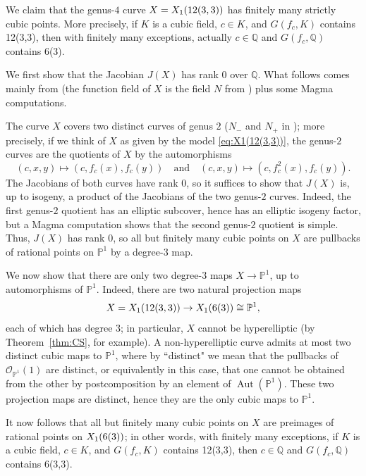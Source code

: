 \documentclass[12pt]{amsart}
\theoremstyle{definition}
\newcommand{\bbP}{\mathbb{P}}
\newcommand{\bbQ}{\mathbb{Q}}
\newcommand{\Aut}{\operatorname{Aut}}
\numberwithin{equation}{section}
\begin{document}
 We claim that the genus-$4$ curve $X = X_1({\rm 12(3,3)})$ has finitely many strictly cubic points. More precisely, if $K$ is a cubic field, $c \in K$, and $G(f_c,K)$ contains 12(3,3), then with finitely many exceptions, actually $c \in \bbQ$ and $G(f_c,\bbQ)$ contains 6(3).

We first show that the Jacobian $J(X)$ has rank $0$ over $\bbQ$. What follows comes mainly from \cite[]{morton:1992} (the function field of $X$ is the field $N$ from \cite{morton:1992}) plus some Magma computations.

The curve $X$ covers two distinct curves of genus $2$ ($N_-$ and $N_+$ in \cite{morton:1992}); more precisely, if we think of $X$ as given by the model \eqref{eq:X1(12(3,3))}, the genus-$2$ curves are the quotients of $X$ by the automorphisms
    \[
        (c,x,y)\mapsto(c,f_c(x),f_c(y)) \quad\text{and}\quad 
        (c,x,y)\mapsto(c,f_c^2(x),f_c(y)).
    \]
The Jacobians of both curves have rank $0$, so it suffices to show that $J(X)$ is, up to isogeny, a product of the Jacobians of the two genus-$2$ curves. Indeed, the first genus-$2$ quotient has an elliptic subcover, hence has an elliptic isogeny factor, but a Magma computation shows that the second genus-$2$ quotient is simple. Thus, $J(X)$ has rank $0$, so all but finitely many cubic points on $X$ are pullbacks of rational points on $\bbP^1$ by a degree-$3$ map.

We now show that there are only two degree-$3$ maps $X \to \bbP^1$, up to automorphisms of $\bbP^1$. Indeed, there are two natural projection maps
    \[
        X = X_1({\rm 12(3,3)}) \to X_1({\rm 6(3)}) \cong \bbP^1,
    \]
each of which has degree $3$; in particular, $X$ cannot be hyperelliptic (by Theorem~\ref{thm:CS}, for example). A non-hyperelliptic curve admits at most two distinct cubic maps to $\bbP^1$, where by ``distinct" we mean that the pullbacks of $\mathcal{O}_{\mathbb{P}^1}(1)$ are distinct, or equivalently in this case, that one cannot be obtained from the other by postcomposition by an element of $\Aut(\bbP^1)$.
These two projection maps are distinct, hence they are the only cubic maps to $\bbP^1$.

It now follows that all but finitely many cubic points on $X$ are preimages of rational points on $X_1({\rm 6(3)})$; in other words, with finitely many exceptions, if $K$ is a cubic field, $c \in K$, and $G(f_c,K)$ contains 12(3,3), then $c \in \bbQ$ and $G(f_c,\bbQ)$ contains 6(3,3). 
\end{document}
